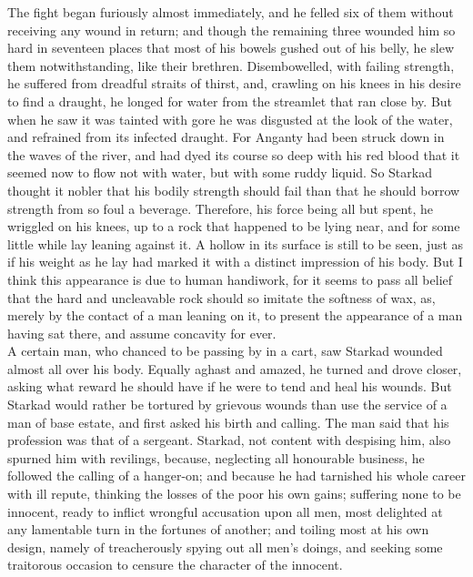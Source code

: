 \documentclass[10pt,a4paper]{report}
\begin{document}
The fight began furiously almost immediately, and he felled six of them without receiving any wound in return; and though the remaining three wounded him so hard in seventeen places that most of his bowels gushed out of his belly, he slew them notwithstanding, like their brethren. Disembowelled, with failing strength, he suffered from dreadful straits of thirst, and, crawling on his knees in his desire to find a draught, he longed for water from the streamlet that ran close by. But when he saw it was tainted with gore he was disgusted at the look of the water, and refrained from its infected draught. For Anganty had been struck down in the waves of the river, and had dyed its course so deep with his red blood that it seemed now to flow not with water, but with some ruddy liquid. So Starkad thought it nobler that his bodily strength should fail than that he should borrow strength from so foul a beverage. Therefore, his force being all but spent, he wriggled on his knees, up to a rock that happened to be lying near, and for some little while lay leaning against it. A hollow in its surface is still to be seen, just as if his weight as he lay had marked it with a distinct impression of his body. But I think this appearance is due to human handiwork, for it seems to pass all belief that the hard and uncleavable rock should so imitate the softness of wax, as, merely by the contact of a man leaning on it, to present the appearance of a man having sat there, and assume concavity for ever.\\

A certain man, who chanced to be passing by in a cart, saw Starkad wounded almost all over his body. Equally aghast and amazed, he turned and drove closer, asking what reward he should have if he were to tend and heal his wounds. But Starkad would rather be tortured by grievous wounds than use the service of a man of base estate, and first asked his birth and calling. The man said that his profession was that of a sergeant. Starkad, not content with despising him, also spurned him with revilings, because, neglecting all honourable business, he followed the calling of a hanger-on; and because he had tarnished his whole career with ill repute, thinking the losses of the poor his own gains; suffering none to be innocent, ready to inflict wrongful accusation upon all men, most delighted at any lamentable turn in the fortunes of another; and toiling most at his own design, namely of treacherously spying out all men's doings, and seeking some traitorous occasion to censure the character of the innocent.\\
\end{document}
